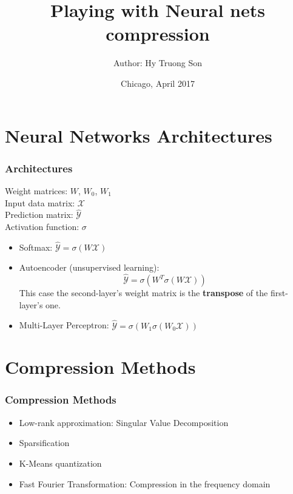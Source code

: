 \documentclass[7pt]{beamer}
\title[]{Playing with Neural nets compression}
\author[Hy T. Son]{Author: Hy Truong Son}
\date{\vspace{5cm} Chicago, April 2017}
\institute[UChicago]{\large The University of Chicago}
\begin{document}
\begin{sloppypar}
\begin{frame}[c]

\maketitle

\end{frame}


\section{Neural Networks Architectures}

\begin{frame}
\frametitle{Architectures}
\begin{justify}
Weight matrices: $W$, $W_0$, $W_1$ \\
Input data matrix: $\mathcal{X}$ \\
Prediction matrix: $\hat{\mathcal{Y}}$ \\
Activation function: $\sigma$ \\
\begin{itemize}
	\item Softmax: $\hat{\mathcal{Y}} = \sigma(W\mathcal{X})$
	\item Autoencoder (unsupervised learning): $$\hat{\mathcal{Y}} = \sigma(W^T\sigma(W\mathcal{X}))$$ This case the second-layer's weight matrix is the \textbf{transpose} of the first-layer's one.
	\item Multi-Layer Perceptron: $\hat{\mathcal{Y}} = \sigma(W_1\sigma(W_0\mathcal{X}))$
\end{itemize}
\end{justify}
\end{frame}

\section{Compression Methods}

\begin{frame}
\frametitle{Compression Methods}
\begin{justify}
\begin{itemize}
	\item Low-rank approximation: Singular Value Decomposition
	\item Sparsification
	\item K-Means quantization
	\item Fast Fourier Transformation: Compression in the frequency domain
\end{itemize}
\end{justify}
\end{frame}


\end{sloppypar}
\end{document}
